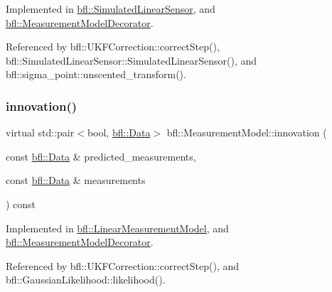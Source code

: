 Implemented in \mbox{\hyperlink{classbfl_1_1SimulatedLinearSensor_a00e869da2b16b5ead1d76a7b32e9fc4b}{bfl\+::\+Simulated\+Linear\+Sensor}}, and \mbox{\hyperlink{classbfl_1_1MeasurementModelDecorator_a9522d1549c62f55a59401f6fa53421e8}{bfl\+::\+Measurement\+Model\+Decorator}}.



Referenced by bfl\+::\+U\+K\+F\+Correction\+::correct\+Step(), bfl\+::\+Simulated\+Linear\+Sensor\+::\+Simulated\+Linear\+Sensor(), and bfl\+::sigma\+\_\+point\+::unscented\+\_\+transform().

\mbox{\label{classbfl_1_1MeasurementModel_aa06e0643805551a981bcc013ad44c829}} 
\subsubsection{\texorpdfstring{innovation()}{innovation()}}
{\footnotesize\ttfamily virtual std\+::pair$<$bool, \mbox{\hyperlink{namespacebfl_af6b103c6821db1b54452f776fdd9dd02}{bfl\+::\+Data}}$>$ bfl\+::\+Measurement\+Model\+::innovation (\begin{DoxyParamCaption}\item[{const \mbox{\hyperlink{namespacebfl_af6b103c6821db1b54452f776fdd9dd02}{bfl\+::\+Data}} \&}]{predicted\+\_\+measurements,  }\item[{const \mbox{\hyperlink{namespacebfl_af6b103c6821db1b54452f776fdd9dd02}{bfl\+::\+Data}} \&}]{measurements }\end{DoxyParamCaption}) const\hspace{0.3cm}{\ttfamily [pure virtual]}}



Implemented in \mbox{\hyperlink{classbfl_1_1LinearMeasurementModel_a12485b4b6d511e97e338a4db6861b277}{bfl\+::\+Linear\+Measurement\+Model}}, and \mbox{\hyperlink{classbfl_1_1MeasurementModelDecorator_af2c4f2057a721f77d02fc54498136d47}{bfl\+::\+Measurement\+Model\+Decorator}}.



Referenced by bfl\+::\+U\+K\+F\+Correction\+::correct\+Step(), and bfl\+::\+Gaussian\+Likelihood\+::likelihood().

\mbox{\label{classbfl_1_1Logger_ad44f46593cb8c4c87c1178eb326e2f64}} 
